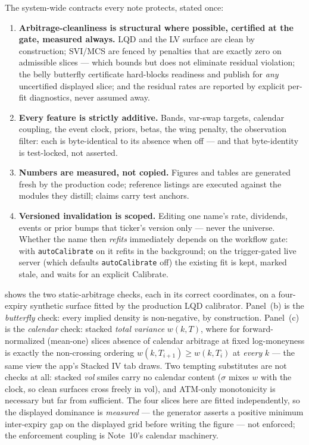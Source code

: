 \documentclass[11pt]{article}
\begin{document}
\begin{invariant}
The system-wide contracts every note protects, stated once:
\begin{enumerate}[leftmargin=1.6em]
\item \textbf{Arbitrage-cleanliness is structural where possible, certified
at the gate, measured always.} LQD and the LV surface are clean by
construction; SVI/MCS are fenced by penalties that are exactly zero on
admissible slices --- which bounds but does not eliminate residual violation;
the belly butterfly certificate hard-blocks readiness and publish for
\emph{any} uncertified displayed slice; and the residual rates are reported
by explicit per-fit diagnostics, never assumed away.
\item \textbf{Every feature is strictly additive.} Bands, var-swap targets,
calendar coupling, the event clock, priors, betas, the wing penalty, the
observation filter: each is byte-identical to its absence when off --- and
that byte-identity is test-locked, not asserted.
\item \textbf{Numbers are measured, not copied.} Figures and tables are
generated fresh by the production code; reference listings are executed
against the modules they distill; claims carry test anchors.
\item \textbf{Versioned invalidation is scoped.} Editing one name's rate,
dividends, events or prior bumps that ticker's version only --- never the
universe. Whether the name then \emph{refits} immediately depends on the
workflow gate: with \texttt{autoCalibrate} on it refits in the background; on
the trigger-gated live server (which defaults \texttt{autoCalibrate} off) the
existing fit is kept, marked stale, and waits for an explicit Calibrate.
\end{enumerate}
\end{invariant}

 shows the two static-arbitrage checks, each in its
correct coordinates, on a four-expiry synthetic surface fitted by the
production LQD calibrator. Panel~(b) is the \emph{butterfly} check: every
implied density is non-negative, by construction. Panel~(c) is the
\emph{calendar} check: stacked \emph{total variance} $w(k,T)$, where for
forward-normalized (mean-one) slices absence of calendar arbitrage at fixed
log-moneyness is exactly the non-crossing ordering $w(k,T_{i+1})\ge w(k,T_i)$
at \emph{every} $k$ --- the same view the app's Stacked IV tab draws. Two
tempting substitutes are not checks at all: stacked \emph{vol} smiles carry
no calendar content ($\sigma$ mixes $w$ with the clock, so clean surfaces
cross freely in vol), and ATM-only monotonicity is necessary but far from
sufficient. The four slices here are fitted independently, so the displayed
dominance is \emph{measured} --- the generator asserts a positive minimum
inter-expiry gap on the displayed grid before writing the figure --- not
enforced; the enforcement coupling is Note~10's calendar machinery.
\end{document}
